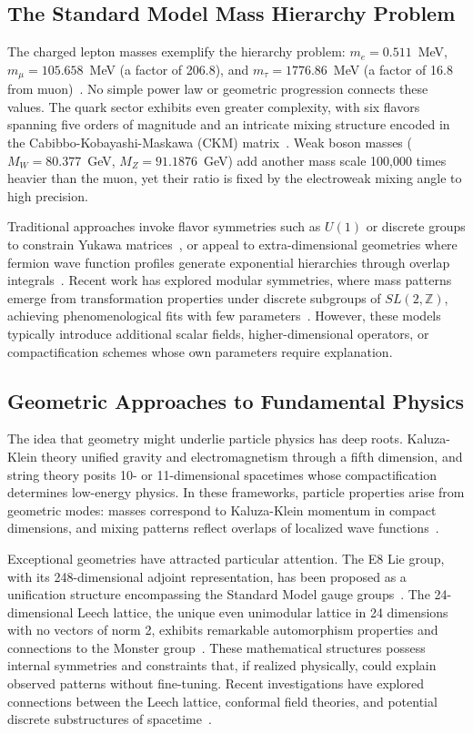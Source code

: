 \documentclass[11pt,a4paper]{article}
\begin{document}
\subsection{The Standard Model Mass Hierarchy Problem}

The charged lepton masses exemplify the hierarchy problem: $m_e = 0.511$~MeV, $m_\mu = 105.658$~MeV (a factor of 206.8), and $m_\tau = 1776.86$~MeV (a factor of 16.8 from muon)~\cite{ref007}. No simple power law or geometric progression connects these values. The quark sector exhibits even greater complexity, with six flavors spanning five orders of magnitude and an intricate mixing structure encoded in the Cabibbo-Kobayashi-Maskawa (CKM) matrix~\cite{ref002}. Weak boson masses ($M_W = 80.377$~GeV, $M_Z = 91.1876$~GeV) add another mass scale 100,000 times heavier than the muon, yet their ratio is fixed by the electroweak mixing angle to high precision.

Traditional approaches invoke flavor symmetries such as $U(1)$ or discrete groups to constrain Yukawa matrices~\cite{ref001}, or appeal to extra-dimensional geometries where fermion wave function profiles generate exponential hierarchies through overlap integrals~\cite{ref002}. Recent work has explored modular symmetries, where mass patterns emerge from transformation properties under discrete subgroups of $SL(2,\mathbb{Z})$, achieving phenomenological fits with few parameters~\cite{ref001,ref006}. However, these models typically introduce additional scalar fields, higher-dimensional operators, or compactification schemes whose own parameters require explanation.

\subsection{Geometric Approaches to Fundamental Physics}

The idea that geometry might underlie particle physics has deep roots. Kaluza-Klein theory unified gravity and electromagnetism through a fifth dimension, and string theory posits 10- or 11-dimensional spacetimes whose compactification determines low-energy physics. In these frameworks, particle properties arise from geometric modes: masses correspond to Kaluza-Klein momentum in compact dimensions, and mixing patterns reflect overlaps of localized wave functions~\cite{ref002}.

Exceptional geometries have attracted particular attention. The E8 Lie group, with its 248-dimensional adjoint representation, has been proposed as a unification structure encompassing the Standard Model gauge groups~\cite{ref004}. The 24-dimensional Leech lattice, the unique even unimodular lattice in 24 dimensions with no vectors of norm 2, exhibits remarkable automorphism properties and connections to the Monster group~\cite{ref004}. These mathematical structures possess internal symmetries and constraints that, if realized physically, could explain observed patterns without fine-tuning. Recent investigations have explored connections between the Leech lattice, conformal field theories, and potential discrete substructures of spacetime~\cite{ref004}.
\end{document}
